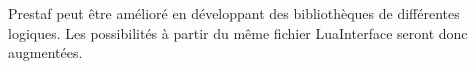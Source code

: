 \documentclass{article}%
\begin{document}
Prestaf peut être amélioré en développant des bibliothèques de différentes logiques. Les possibilités à partir du même fichier LuaInterface seront donc augmentées.


\appendix

\printglossaries

{}


\end{document}
